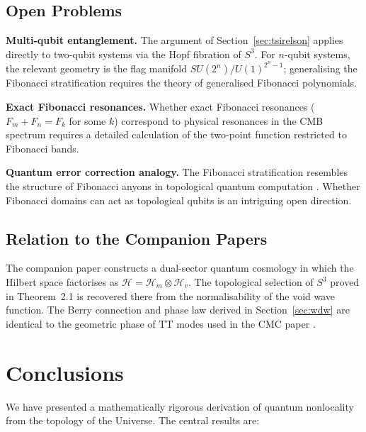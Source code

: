 \documentclass[12pt,a4paper]{article}
\theoremstyle{definition}
\theoremstyle{remark}
\begin{document}
\subsection{Open Problems}

\textbf{Multi-qubit entanglement.} The argument of Section~\ref{sec:tsirelson}
applies directly to two-qubit systems via the Hopf fibration of $S^3$. For $n$-qubit
systems, the relevant geometry is the flag manifold $SU(2^n)/U(1)^{2^n-1}$;
generalising the Fibonacci stratification requires the theory of generalised Fibonacci
polynomials.

\textbf{Exact Fibonacci resonances.} Whether exact Fibonacci resonances
($F_m+F_n=F_k$ for some $k$) correspond to physical resonances in the CMB spectrum
requires a detailed calculation of the two-point function restricted to Fibonacci
bands.

\textbf{Quantum error correction analogy.} The Fibonacci stratification resembles
the structure of Fibonacci anyons in topological quantum computation \cite{Preskill}.
Whether Fibonacci domains can act as topological qubits is an intriguing open
direction.

\subsection{Relation to the Companion Papers}

The companion paper \cite{PreeceBatenin2026} constructs a dual-sector quantum
cosmology in which the Hilbert space factorises as
$\mathcal{H} = \mathcal{H}_m\otimes\mathcal{H}_v$. The topological selection of
$S^3$ proved in Theorem~2.1 is recovered there from the normalisability of the void
wave function. The Berry connection and phase law derived in Section~\ref{sec:wdw}
are identical to the geometric phase of TT modes used in the CMC paper
\cite{PreeceBatenin2025}.

\section{Conclusions}
\label{sec:conclusions}

We have presented a mathematically rigorous derivation of quantum nonlocality from
the topology of the Universe. The central results are:
\end{document}
